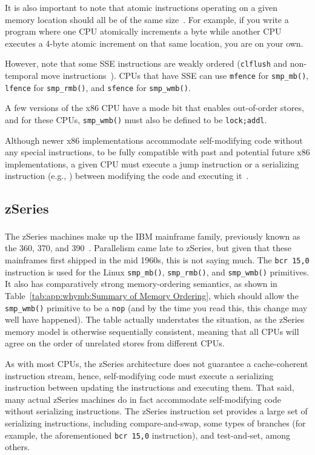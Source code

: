 It is also important to note that atomic instructions operating
on a given memory location should all be of the same
size~\cite[Section 8.1.2.2]{Intel64IA32v3A2011}.
For example, if you write a program where one CPU atomically increments
a byte while another CPU executes a 4-byte atomic increment on
that same location, you are on your own.

However, note that some SSE instructions are weakly ordered ({\tt clflush}
and non-temporal move instructions~\cite{IntelXeonV2b-96a}).
CPUs that have SSE can use {\tt mfence} for {\tt smp\_mb()},
{\tt lfence} for {\tt smp\_rmb()}, and {\tt sfence} for {\tt smp\_wmb()}.

A few versions of the x86 CPU have a mode bit that enables out-of-order
stores, and for these CPUs, {\tt smp\_wmb()} must also be defined to
be {\tt lock;addl}.

Although newer x86 implementations accommodate self-modifying code
without any special instructions, to be fully compatible with
past and potential future x86 implementations, a given CPU must
execute a jump instruction or a serializing instruction (e.g., )
between modifying the code and executing
it~\cite[Section 8.1.3]{Intel64IA32v3A2011}.

\subsection{zSeries}

The zSeries machines make up the IBM\textsuperscript{\texttrademark}
mainframe family, previously
known as the 360, 370, and 390~\cite{IBMzSeries04a}.
Parallelism came late to zSeries, but given that these mainframes first
shipped in the mid 1960s, this is not saying much.
The {\tt bcr 15,0} instruction is used for the Linux {\tt smp\_mb()},
{\tt smp\_rmb()}, and {\tt smp\_wmb()} primitives.
It also has comparatively strong memory-ordering semantics, as shown in
Table~\ref{tab:app:whymb:Summary of Memory Ordering}, which should allow the
{\tt smp\_wmb()} primitive to be a {\tt nop} (and by the time you read this,
this change may well have happened).
The table actually understates the situation, as the zSeries memory model
is otherwise sequentially consistent, meaning that all CPUs
will agree on the order of unrelated stores from different CPUs.

As with most CPUs, the zSeries architecture does not guarantee a
cache-coherent instruction stream, hence,
self-modifying code must execute a serializing instruction between updating
the instructions and executing them.
That said, many actual zSeries machines do in fact accommodate self-modifying
code without serializing instructions.
The zSeries instruction set provides a large set of serializing instructions,
including compare-and-swap, some types of branches (for example, the
aforementioned {\tt bcr 15,0} instruction), and test-and-set,
among others.

